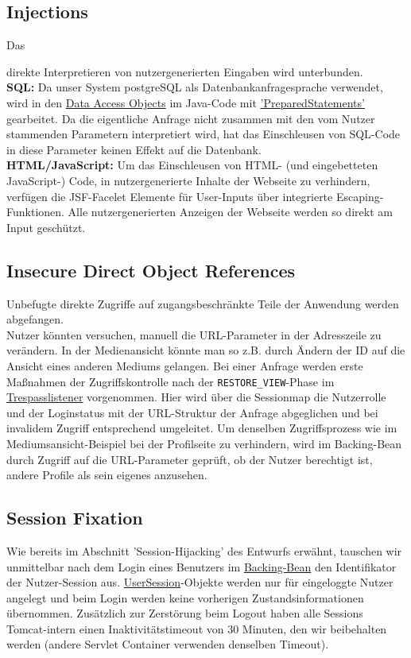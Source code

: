 \documentclass{article}
\begin{document}
\subsection{Injections}
\hypertarget{Injections}{Das} direkte Interpretieren von nutzergenerierten Eingaben wird unterbunden.\\
\textbf{SQL:} Da unser System postgreSQL als Datenbankanfragesprache verwendet, wird in den \hyperlink{DAOs}{Data Access Objects} im Java-Code mit \hyperlink{https://docs.oracle.com/javase/7/docs/api/java/sql/PreparedStatement.html}{'PreparedStatements'} gearbeitet. Da die eigentliche Anfrage nicht zusammen mit den vom Nutzer stammenden Parametern interpretiert wird, hat das Einschleusen von SQL-Code in diese Parameter keinen Effekt auf die Datenbank.\\
\textbf{HTML/JavaScript:} \hypertarget{XSS}{Um} das Einschleusen von HTML- (und eingebetteten JavaScript-) Code, in nutzergenerierte Inhalte der Webseite zu verhindern, verfügen die JSF-Facelet Elemente für User-Inputs über integrierte Escaping-Funktionen. Alle nutzergenerierten Anzeigen der Webseite werden so direkt am Input geschützt.
\subsection{Insecure Direct Object References}
Unbefugte direkte Zugriffe auf zugangsbeschränkte Teile der Anwendung werden abgefangen.\\
Nutzer könnten versuchen, manuell die URL-Parameter in der Adresszeile zu verändern. In der Medienansicht könnte man so z.B. durch Ändern der ID auf die Ansicht eines anderen Mediums gelangen. Bei einer Anfrage werden erste Maßnahmen der Zugriffskontrolle nach der \texttt{RESTORE\_VIEW}-Phase im \hyperlink{PhaseListener}{Trespasslistener} vorgenommen. Hier wird über die Sessionmap die Nutzerrolle und der Loginstatus mit der URL-Struktur der Anfrage abgeglichen und bei invalidem Zugriff entsprechend umgeleitet. Um denselben Zugriffsprozess wie im Mediumsansicht-Beispiel bei der Profilseite zu verhindern, wird im Backing-Bean durch Zugriff auf die URL-Parameter geprüft, ob der Nutzer berechtigt ist, andere Profile als sein eigenes anzusehen.
\subsection{Session Fixation}
Wie bereits im Abschnitt 'Session-Hijacking' des Entwurfs erwähnt, tauschen wir unmittelbar nach dem Login eines Benutzers im \hyperlink{Login}{Backing-Bean} den Identifikator der Nutzer-Session aus. \hyperlink{Session}{UserSession}-Objekte werden nur für eingeloggte Nutzer angelegt und beim Login werden keine vorherigen Zustandsinformationen übernommen.  Zusätzlich zur Zerstörung beim Logout haben alle Sessions Tomcat-intern einen Inaktivitätstimeout von 30 Minuten, den wir beibehalten werden (andere Servlet Container verwenden denselben Timeout).
\end{document}
